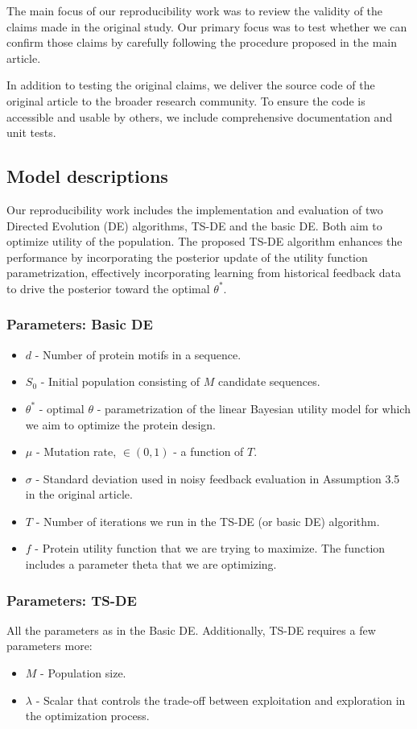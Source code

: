 The main focus of our reproducibility work was to review the validity of the claims made in the original study. Our primary focus was to test whether we can confirm those claims by carefully following the procedure proposed in the main article. 

In addition to testing the original claims, we deliver the source code of the original article to the broader research community. To ensure the code is accessible and usable by others, we include comprehensive documentation and unit tests.

\subsection{Model descriptions}
Our reproducibility work includes the implementation and evaluation of two Directed Evolution (DE) algorithms, TS-DE and the basic DE. Both aim to optimize utility of the population. The proposed TS-DE algorithm enhances the performance by incorporating the posterior update of the utility function parametrization, effectively incorporating learning from historical feedback data to drive the posterior toward the optimal $\theta^*$. 

\subsubsection{Parameters: Basic DE}
\begin{itemize}
    \item \textbf{$d$} - Number of protein motifs in a sequence.
    \item \textbf{$S_0$} - Initial population consisting of $M$ candidate sequences.
    \item \textbf{$\theta^*$} - optimal $\theta$ - parametrization of the linear Bayesian utility model for which we aim to optimize the protein design.
    \item \textbf{$\mu$} - Mutation rate, $\in (0, 1)$ - a function of $T$.
    \item \textbf{$\sigma$} - Standard deviation used in noisy feedback evaluation in Assumption 3.5 in the original article.
    \item \textbf{$T$} - Number of iterations we run in the TS-DE (or basic DE) algorithm.
    \item \textbf{$f$} - Protein utility function that we are trying to maximize. The function includes a parameter theta that we are optimizing.
\end{itemize}
\subsubsection{Parameters: TS-DE}
All the parameters as in the Basic DE. Additionally, TS-DE requires a few parameters more:
\begin{itemize}
    \item \textbf{$M$} - Population size.
    \item \textbf{$\lambda$} - Scalar that controls the trade-off between exploitation and exploration in the optimization process.
\end{itemize}


